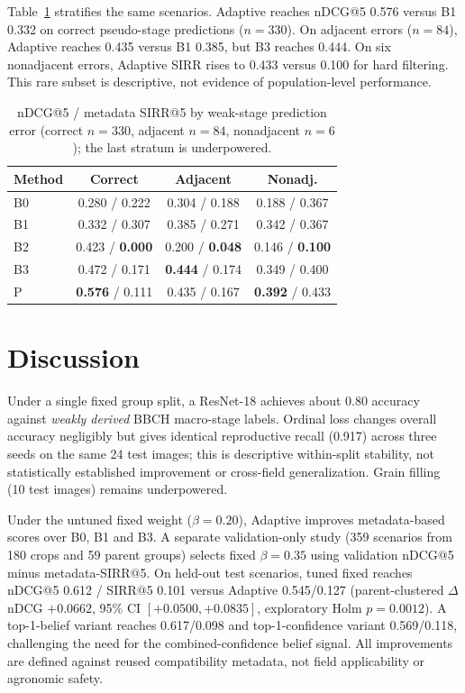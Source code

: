 \documentclass[conference,a4paper]{IEEEtran}
\begin{document}
Table~\ref{tab:strat} stratifies the same scenarios. Adaptive reaches nDCG@5 0.576 versus B1 0.332 on correct pseudo-stage predictions ($n=330$). On adjacent errors ($n=84$), Adaptive reaches 0.435 versus B1 0.385, but B3 reaches 0.444. On six nonadjacent errors, Adaptive SIRR rises to 0.433 versus 0.100 for hard filtering. This rare subset is descriptive, not evidence of population-level performance.

\begin{table}[t]
\centering
\caption{nDCG@5 / metadata SIRR@5 by weak-stage prediction error (correct $n=330$, adjacent $n=84$, nonadjacent $n=6$); the last stratum is underpowered.}
\label{tab:strat}
\small
\begin{tabular}{lccc}
\toprule
\textbf{Method} & \textbf{Correct} & \textbf{Adjacent} & \textbf{Nonadj.} \\
\midrule
B0 & 0.280 / 0.222 & 0.304 / 0.188 & 0.188 / 0.367 \\
B1 & 0.332 / 0.307 & 0.385 / 0.271 & 0.342 / 0.367 \\
B2 & 0.423 / \textbf{0.000} & 0.200 / \textbf{0.048} & 0.146 / \textbf{0.100} \\
B3 & 0.472 / 0.171 & \textbf{0.444} / 0.174 & 0.349 / 0.400 \\
P & \textbf{0.576} / 0.111 & 0.435 / 0.167 & \textbf{0.392} / 0.433 \\
\bottomrule
\end{tabular}
\end{table}




\section{Discussion}
Under a single fixed group split, a ResNet-18 achieves about 0.80 accuracy against \emph{weakly derived} BBCH macro-stage labels. Ordinal loss changes overall accuracy negligibly but gives identical reproductive recall (0.917) across three seeds on the same 24 test images; this is descriptive within-split stability, not statistically established improvement or cross-field generalization. Grain filling (10 test images) remains underpowered.

Under the untuned fixed weight ($\beta=0.20$), Adaptive improves metadata-based scores over B0, B1 and B3. A separate validation-only study (359 scenarios from 180 crops and 59 parent groups) selects fixed $\beta=0.35$ using validation nDCG@5 minus metadata-SIRR@5. On held-out test scenarios, tuned fixed reaches nDCG@5 0.612 / SIRR@5 0.101 versus Adaptive 0.545/0.127 (parent-clustered $\Delta$ nDCG $+0.0662$, 95\% CI $[+0.0500,+0.0835]$, exploratory Holm $p=0.0012$). A top-1-belief variant reaches 0.617/0.098 and top-1-confidence variant 0.569/0.118, challenging the need for the combined-confidence belief signal. All improvements are defined against reused compatibility metadata, not field applicability or agronomic safety.
\end{document}
